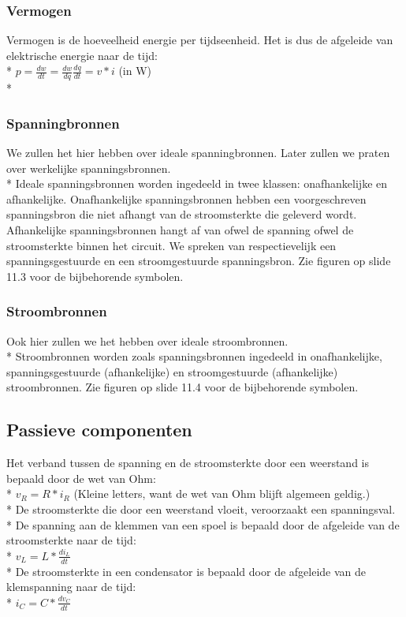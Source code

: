 \documentclass[10pt]{article}
\begin{document}
\subsubsection{Vermogen}
Vermogen is de hoeveelheid energie per tijdseenheid. Het is dus de afgeleide van elektrische energie naar de tijd:\\*
$p = \frac{dw}{dt} = \frac{dw}{dq}\frac{dq}{dt} = v*i$ (in W)\\*
\subsubsection{Spanningbronnen}
We zullen het hier hebben over ideale spanningbronnen. Later zullen we praten over werkelijke spanningsbronnen.\\*
Ideale spanningsbronnen worden ingedeeld in twee klassen: onafhankelijke en afhankelijke. Onafhankelijke spanningsbronnen hebben een voorgeschreven spanningsbron die niet afhangt van de stroomsterkte die geleverd wordt. Afhankelijke spanningsbronnen hangt af van ofwel de spanning ofwel de stroomsterkte binnen het circuit. We spreken van respectievelijk een spanningsgestuurde en een stroomgestuurde spanningsbron. Zie figuren op slide 11.3 voor de bijbehorende symbolen.
\subsubsection{Stroombronnen}
Ook hier zullen we het hebben over ideale stroombronnen.\\*
Stroombronnen worden zoals spanningsbronnen ingedeeld in onafhankelijke, spanningsgestuurde (afhankelijke) en stroomgestuurde (afhankelijke) stroombronnen. Zie figuren op slide 11.4 voor de bijbehorende symbolen.
\subsection{Passieve componenten}
Het verband tussen de spanning en de stroomsterkte door een weerstand is bepaald door de wet van Ohm:\\*
$v_R = R*i_R$ {\scriptsize(Kleine letters, want de wet van Ohm blijft algemeen geldig.)}\\*
De stroomsterkte die door een weerstand vloeit, veroorzaakt een spanningsval.\\*
De spanning aan de klemmen van een spoel is bepaald door de afgeleide van de stroomsterkte naar de tijd:\\*
$v_L = L*\frac{di_L}{dt}$\\*
De stroomsterkte in een condensator is bepaald door de afgeleide van de klemspanning naar de tijd:\\*
$i_C = C*\frac{dv_C}{dt}$
\end{document}
